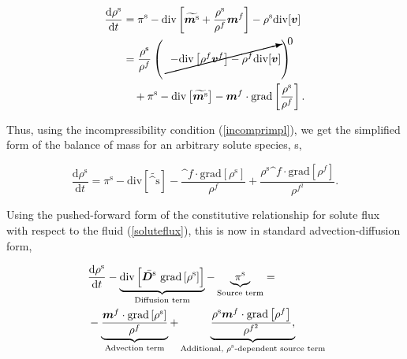 \begin{equation}
\begin{split}
\frac{\mathrm{d}\rho^\mathrm{s}}{\mathrm{d}t} &= \pi^\mathrm{s}-
\mathrm{div} \left[\widetilde{\bm^\mathrm{s}}+
\frac{\rho^\mathrm{s}}{\rho^f}\bm^f\right] - \rho^\mathrm{s}
\mathrm{div}[\bv]\\ &= \frac{\rho^\mathrm{s}}{\rho^f}\left(\cancelto{0}
{-\mathrm{div}\left[\rho^f \bv^{f}\right] - \rho^f
\mathrm{div}[\bv]}\right)\\ &\quad{} + \pi^\mathrm{s} -
\mathrm{div}\left[\widetilde{\bm^\mathrm{s}}\right]
-\bm^f\cdot\mathrm{grad}\left[\frac{ \rho^\mathrm{s}}{\rho^f}\right].\\
\end{split}
\end{equation}

Thus, using the incompressibility condition (\ref{incomprimpl}), we
get the simplified form of the balance of mass for an arbitrary solute
species, s,

\begin{equation}
\frac{\mathrm{d}\rho^\mathrm{s}}{\mathrm{d}t}=\pi^\mathrm{s} -
\mathrm{div}\left[\widetilde{\bm^\mathrm{s}}\right] -
\frac{\bm^f\cdot\mathrm{grad}\left[\rho^\mathrm{s}\right]}{\rho^f} +
\frac{\rho^\mathrm{s} \bm^f \cdot \mathrm{grad}\left[\rho^f\right]}
{\rho^{f^2}}.
\label{stdform}
\end{equation}

\noindent Using the pushed-forward form of the constitutive
relationship for solute flux with respect to the fluid
(\ref{soluteflux}), this is now in standard advection-diffusion form,

\begin{equation}
\begin{split}
& \frac{\mathrm{d}\rho^\mathrm{s}}{\mathrm{d}t} - \underbrace{
 \mathrm{div}\left[\bar{\mbox{\boldmath$ D$}^\mathrm{s}}\ \mathrm{grad}
 \left[ \rho^\mathrm{s}\right]\right]}_\text{Diffusion term}
 - \underbrace{\pi^\mathrm{s}}_\text{Source term} =
\\ \ & - \underbrace{\frac{\mbox{\boldmath$ m$}^f\cdot\mathrm{grad}
    \left[\rho^\mathrm{s}\right]}{\rho^f}}
_\text{Advection term} +
\underbrace{ \frac{\rho^\mathrm{s} \mbox{\boldmath$ m$}^f \cdot \mathrm{grad}\left[\rho^f\right]}
     {\rho^{f^2}},}_\text{Additional, $\rho^\mathrm{s}$-dependent source term}
\end{split}
\label{morestdform}
\end{equation}

